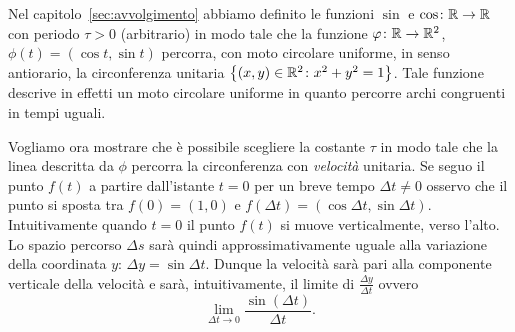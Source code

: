 Nel capitolo~\ref{sec:avvolgimento} abbiamo definito le 
funzioni $\sin$ e $\cos\colon {\mathbb R}\to {\mathbb R}$ con periodo $\tau>0$ (arbitrario)
in modo tale che la funzione $\varphi\colon {\mathbb R}\to{\mathbb R}^2$, $\phi(t)=(\cos t, \sin t)$ 
percorra, con moto circolare uniforme, in senso antiorario, la circonferenza 
unitaria ${\left\{ (x,y)\in {\mathbb R}^2\colon x^2+y^2=1 \right\}}$.
Tale funzione descrive in effetti un moto circolare uniforme 
in quanto percorre archi congruenti in tempi uguali.

Vogliamo ora mostrare che è possibile scegliere la costante $\tau$
in modo tale che la linea descritta da $\phi$ percorra la circonferenza 
con \emph{velocità} unitaria.
%
Se seguo il punto $f(t)$ a partire dall'istante $t=0$ per un breve tempo 
$\Delta t\neq 0$
osservo che il punto si sposta tra $f(0) = (1,0)$ e 
$f(\Delta t) = (\cos \Delta t, \sin \Delta t)$.
%
Intuitivamente quando $t=0$ il punto $f(t)$ si muove verticalmente, 
verso l'alto. 
Lo spazio percorso $\Delta s$ sarà quindi approssimativamente 
uguale alla variazione della coordinata $y$: 
$\Delta y = \sin \Delta t$.
Dunque la velocità sarà pari alla componente verticale della velocità 
e sarà, intuitivamente, il limite di $\frac{\Delta y}{\Delta t}$ ovvero 
\[
\lim_{\Delta t\to 0} \frac{\sin(\Delta t)}{\Delta t}.  
\]

